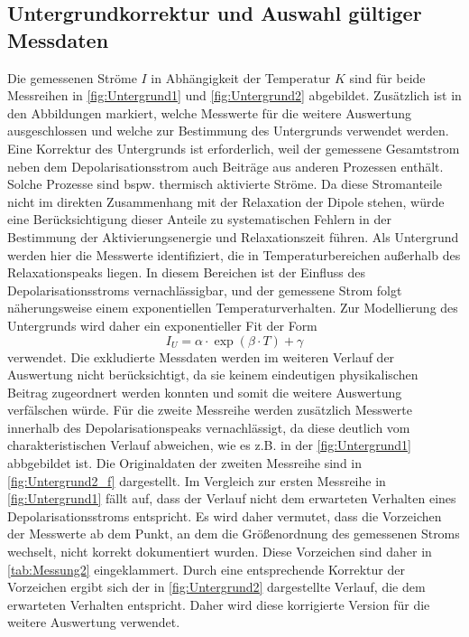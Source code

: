 \subsection{Untergrundkorrektur und Auswahl gültiger Messdaten}
\label{sec:Untergrundkorrektur}
Die gemessenen Ströme $I$ in Abhängigkeit der Temperatur $K$ sind für beide Messreihen in \autoref{fig:Untergrund1} und \autoref{fig:Untergrund2} abgebildet.
Zusätzlich ist in den Abbildungen markiert, welche Messwerte für die weitere Auswertung ausgeschlossen und welche zur Bestimmung des Untergrunds verwendet werden.
Eine Korrektur des Untergrunds ist erforderlich, weil der gemessene Gesamtstrom neben dem Depolarisationsstrom auch Beiträge aus anderen Prozessen enthält. Solche Prozesse sind bspw. thermisch aktivierte Ströme. 
Da diese Stromanteile nicht im direkten Zusammenhang mit der Relaxation der Dipole stehen, würde eine Berücksichtigung dieser Anteile zu systematischen Fehlern in der Bestimmung der Aktivierungsenergie und Relaxationszeit führen. 
Als Untergrund werden hier die Messwerte identifiziert, die in Temperaturbereichen außerhalb des Relaxationspeaks liegen. 
In diesem Bereichen ist der Einfluss des Depolarisationsstroms vernachlässigbar, und der gemessene Strom folgt näherungsweise einem exponentiellen Temperaturverhalten.
Zur Modellierung des Untergrunds wird daher ein exponentieller Fit der Form 
$$
I_U = \alpha \cdot \exp(\beta\cdot T) + \gamma
$$
verwendet. 
Die exkludierte Messdaten werden im weiteren Verlauf der Auswertung nicht berücksichtigt, da sie keinem eindeutigen physikalischen Beitrag zugeordnert werden konnten und somit die weitere Auswertung verfälschen würde. 
Für die zweite Messreihe werden zusätzlich Messwerte innerhalb des Depolarisationspeaks vernachlässigt, da diese deutlich vom charakteristischen Verlauf abweichen, wie es z.B. in der \autoref{fig:Untergrund1} abbgebildet ist.
Die Originaldaten der zweiten Messreihe sind in \autoref{fig:Untergrund2_f} dargestellt. 
Im Vergleich zur ersten Messreihe in \autoref{fig:Untergrund1} fällt auf, dass der Verlauf nicht dem erwarteten Verhalten eines Depolarisationsstroms entspricht. 
Es wird daher vermutet, dass die Vorzeichen der Messwerte ab dem Punkt, an dem die Größenordnung des gemessenen Stroms wechselt, nicht korrekt dokumentiert wurden. Diese Vorzeichen sind daher in \autoref{tab:Messung2} eingeklammert.
Durch eine entsprechende Korrektur der Vorzeichen ergibt sich der in \autoref{fig:Untergrund2} dargestellte Verlauf, die dem erwarteten Verhalten entspricht. Daher wird diese korrigierte Version für die weitere Auswertung verwendet.\\
